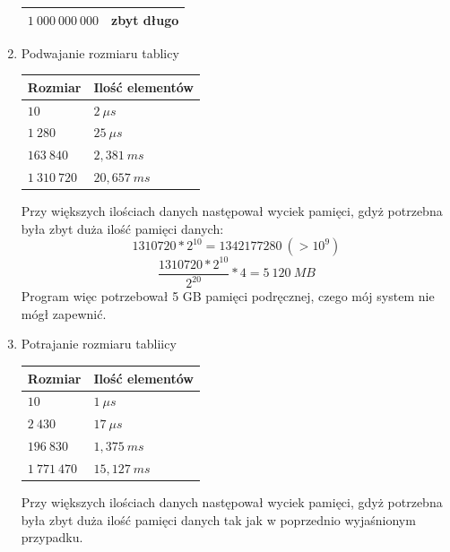 \documentclass[11pt, a4paper]{article}
\begin{document}
\begin{enumerate}
\begin{center}
\begin{tabular}{| p{5cm} | p{5cm} |}
			$1\ 000\ 000\ 000$ & zbyt długo \\ \hline
	    \end{tabular}
	    \end{center}
	\item Podwajanie rozmiaru tablicy
		\begin{center}
		\begin{tabular}{| p{5cm} | p{5cm} |}
			\hline
			Rozmiar & Ilość elementów \\ \hline
        		$10$ &  $2\ \mu s$ \\ \hline
	        $1\ 280$ & $25\ \mu s$ \\ \hline
	        $163\ 840$ & $2,381\ ms$ \\ \hline                                                            
    		    $1\ 310\ 720$ & $20,657\ ms$ \\ \hline
	    \end{tabular}
	    \end{center}
	    Przy większych ilościach danych następował wyciek pamięci, gdyż potrzebna
	    była zbyt duża ilość pamięci danych:\\
	    $$1310720*2^{10}=1342177280\ (>10^9)$$
	    \[ \frac{1310720*2^{10}}{{2^{20}}}*4=5\ 120\ MB \]
	    Program więc potrzebował 5 GB pamięci podręcznej, czego mój system nie mógł
	    zapewnić.
	    
	\item Potrajanie rozmiaru tabliicy
		\begin{center}
		\begin{tabular}{| p{5cm} | p{5cm} |}
			\hline
			Rozmiar & Ilość elementów \\ \hline
			$10$ & $1\ \mu s$ \\ \hline
            $2\ 430$ & $17\ \mu s$ \\ \hline
         	$196\ 830$ & $1,375\ ms$ \\ \hline
        		$1\ 771\ 470$ & $15,127\ ms$ \\ \hline   
	    \end{tabular}
	    \end{center}
    	    Przy większych ilościach danych następował wyciek pamięci, gdyż potrzebna
	    była zbyt duża ilość pamięci danych tak jak w poprzednio wyjaśnionym przypadku.
	    

\end{enumerate}
\end{document}
